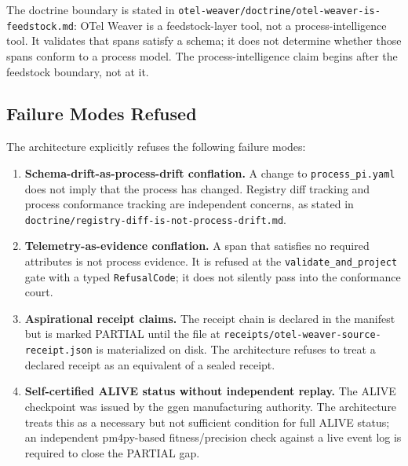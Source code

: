 The doctrine boundary is stated in \texttt{otel-weaver/doctrine/otel-weaver-is-feedstock.md}:
OTel Weaver is a feedstock-layer tool, not a process-intelligence tool. It validates that spans
satisfy a schema; it does not determine whether those spans conform to a process model. The
process-intelligence claim begins after the feedstock boundary, not at it.

\subsection{Failure Modes Refused}
\label{sec:otel-weaver-exp-001-custom-pi-registry-architecture-failures}

The architecture explicitly refuses the following failure modes:

\begin{enumerate}
  \item \textbf{Schema-drift-as-process-drift conflation.} A change to \texttt{process\_pi.yaml}
        does not imply that the process has changed. Registry diff tracking and process conformance
        tracking are independent concerns, as stated in
        \texttt{doctrine/registry-diff-is-not-process-drift.md}.
  \item \textbf{Telemetry-as-evidence conflation.} A span that satisfies no required attributes
        is not process evidence. It is refused at the \texttt{validate\_and\_project} gate with
        a typed \texttt{RefusalCode}; it does not silently pass into the conformance court.
  \item \textbf{Aspirational receipt claims.} The receipt chain is declared in the manifest but
        is marked PARTIAL until the file at \texttt{receipts/otel-weaver-source-receipt.json} is
        materialized on disk. The architecture refuses to treat a declared receipt as an
        equivalent of a sealed receipt.
  \item \textbf{Self-certified ALIVE status without independent replay.} The ALIVE checkpoint
        was issued by the ggen manufacturing authority. The architecture treats this as a
        necessary but not sufficient condition for full ALIVE status; an independent pm4py-based
        fitness/precision check against a live event log is required to close the PARTIAL gap.
\end{enumerate}
